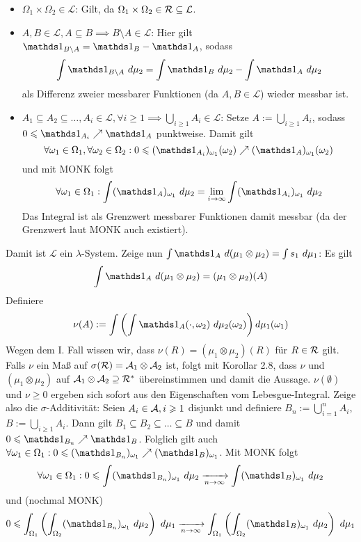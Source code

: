 \documentclass[11pt]{report}
\begin{document}
\begin{enumerate}[label=\Roman*.]
    \begin{itemize}
        \item $\Omega_1\times\Omega_2\in\mathcal{L}$: Gilt, da $\Omega_1\times\Omega_2\in\mathcal{R}\subseteq\mathcal{L}$.
        \item $A,B\in\mathcal{L},A\subseteq B\implies B\setminus A\in\mathcal{L}$: Hier gilt $\ind{B\setminus A}=\ind{B}-\ind{A}$, sodass
        $$\int\ind{B\setminus A}\ d\mu_2=\int\ind{B}\ d\mu_2-\int\ind{A}\ d\mu_2$$
        als Differenz zweier messbarer Funktionen (da $A,B\in\mathcal{L}$) wieder messbar ist.
        \item $A_1\subseteq A_2\subseteq\hdots,A_i\in\mathcal{L},\forall i\geq1\implies\bigcup_{i\geq1}A_i\in\mathcal{L}$: Setze $A:=\bigcup_{i\geq1}A_i$, sodass $0\leq\ind{A_i}\nearrow\ind{A}$ punktweise. Damit gilt
        $$\forall\omega_1\in\Omega_1,\forall\omega_2\in\Omega_2:0\leq(\ind{A_i})_{\omega_1}(\omega_2)\nearrow(\ind{A})_{\omega_1}(\omega_2)$$
        und mit MONK folgt
        $$\forall\omega_1\in\Omega_1:\int(\ind{A})_{\omega_1}\ d\mu_2=\lim_{i\to\infty}\int(\ind{A_i})_{\omega_1}\ d\mu_2$$
        Das Integral ist als Grenzwert messbarer Funktionen damit messbar (da der Grenzwert laut MONK auch existiert).
    \end{itemize} 
    Damit ist $\mathcal{L}$ ein $\lambda$-System. Zeige nun $\int \ind{A}\ d(\mu_1\otimes\mu_2)=\int s_1\ d\mu_1$: Es gilt 
    $$\int\ind{A}\ d(\mu_1\otimes\mu_2)=(\mu_1\otimes\mu_2)(A)$$
    Definiere
    $$\nu(A):=\int\left(\int\ind{A}(\cdot,\omega_2)\ d\mu_2(\omega_2)\right)d \mu_1(\omega_1)$$
    Wegen dem I. Fall wissen wir, dass $\nu(R)=(\mu_1\otimes\mu_2)(R)$ f\"ur $R\in\mathcal{R}$ gilt. Falls $\nu$ ein Ma\ss{} auf $\sigma(\mathcal{R})=\mathcal{A}_1\otimes\mathcal{A}_2$ ist, folgt mit Korollar 2.8, dass $\nu$ und $(\mu_1\otimes\mu_2)$ auf $\mathcal{A}_1\otimes\mathcal{A}_2\supseteq\mathcal{R}^*$ \"ubereinstimmen und damit die Aussage. $\nu(\emptyset)$ und $\nu\geq0$ ergeben sich sofort aus den Eigenschaften vom Lebesgue-Integral. Zeige also die $\sigma$-Additivit\"at:\newline
    Seien $A_i\in\mathcal{A},i\geqslant1$ disjunkt und definiere $B_n:=\bigcup_{i=1}^nA_i$, $B:=\bigcup_{i\geq1}A_i$. Dann gilt
    $B_1\subseteq B_2\subseteq\hdots\subseteq B$ und damit $0\leq\ind{B_n}\nearrow \ind{B}$. Folglich gilt auch $\forall\omega_1\in\Omega_1:0\leq(\ind{B_n})_{\omega_1}\nearrow (\ind{B})_{\omega_1}$. Mit MONK folgt
    $$\forall\omega_1\in\Omega_1:0\leq\int(\ind{B_n})_{\omega_1}\ d\mu_2\nto{}{n\to\infty}\int(\ind{B})_{\omega_1}\ d\mu_2$$
    und (nochmal MONK)
    $$0\leq\int_{\Omega_1}\left(\int_{\Omega_2}(\ind{B_n})_{\omega_1}\ d\mu_2\right)\ d\mu_1\nto{}{n\to\infty}\int_{\Omega_1}\left(\int_{\Omega_2}(\ind{B})_{\omega_1}\ d\mu_2\right)\ d\mu_1$$

\end{enumerate}
\end{document}

